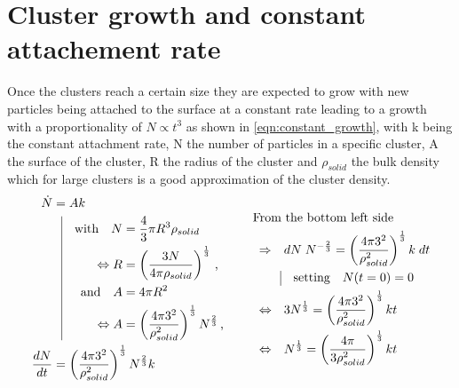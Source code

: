 \section{Cluster growth and constant attachement rate}
\label{sec:cluster_growth}
Once the clusters reach a certain size they are expected to grow with new particles being attached to the surface at a constant rate leading to a growth with a proportionality of $N \propto t^3$ as shown in \autoref{eqn:constant_growth}, with k being the constant attachment rate, N the number of particles in a specific cluster, A the surface of the cluster, R the radius of the cluster and $\rho_{solid}$ the bulk density which for large clusters is a good approximation of the cluster density.\\
\begin{align}
\label{eqn:constant_growth}  
\begin{split}
\dot{N} &= A k \\
          & \; \; \, \vrule
  \begin{aligned}[t]
    \quad \text{with}  \quad  N &= \frac{4}{3} \pi R^3 \rho_{solid}\\
    \Leftrightarrow R &= \left( \frac{3 N }{4 \pi \rho_{solid} }\right)^{\frac{1}{3}} \, \text{,} \\
    \quad \text{and}   \quad A &= 4 \pi R^2 \\
    \Leftrightarrow A &= \left(\frac{4 \pi 3^2 }{\rho_{solid}^2} \right)^\frac{1}{3} N^\frac{2}{3} \, \text{,}\\
  \end{aligned}\\
\frac{dN}{dt} &= \left(\frac{4 \pi 3^2 }{\rho_{solid}^2} \right)^\frac{1}{3}  N^\frac{2}{3} k \\
\end{split}
\hspace{1cm}
\begin{split}
& \!\!\!\!\!\!\!\!\! \text{From the bottom left side}\\
\Rightarrow& \quad dN \; N^{-\frac{2}{3}} = \left(\frac{4 \pi 3^2 }{\rho_{solid}^2} \right)^\frac{1}{3} k \; dt\\
          & \; \; \, \vrule
  \begin{aligned}[t]
    \quad \text{setting}  \quad  N(t=0) = 0\\
  \end{aligned}\\
\Leftrightarrow& \quad 3 N^{\frac{1}{3}} = \left(\frac{4 \pi 3^2 }{\rho_{solid}^2} \right)^\frac{1}{3} k t\\
\Leftrightarrow&  \quad N^{\frac{1}{3}} = \left( \frac{4 \pi}{3 \rho_{solid}^2} \right)^\frac{1}{3} k t
\end{split}
\end{align}  

